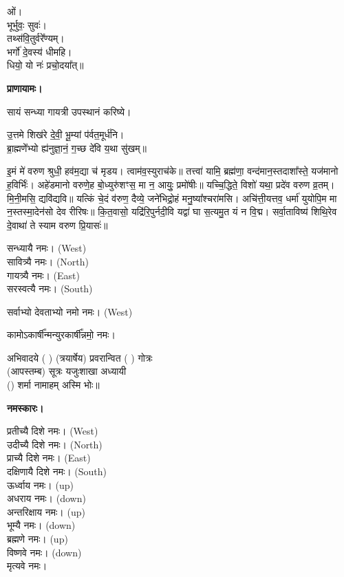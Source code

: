 ओं।\\
भूर्भुवः॒ सुवः॑।\\
तथ्स॑वि॒तुर्वरे᳚ण्यम्।\\
भर्गो॑ दे॒वस्य॑ धीमहि।\\
धियो॒ यो नः॑ प्रचो॒दया᳚त्॥

\textbf{प्राणायामः।}


सायं सन्ध्या गायत्री उपस्थानं करिष्ये।

उ॒त्तमे शिख॑रे दे॒वी॒ भू॒म्यां प॑र्वत॒मूर्ध॑नि।\\
ब्रा॒ह्मणे॑॑भ्यो ह्य॑नुज्ञा॒नं॒ ग॒च्छ दे॑वि य॒था सु॑खम्॥


इ॒मं मे॑ वरुण श्रुधी॒ हव॑म॒द्या च॑ मृडय। त्वाम॑व॒स्युराच॑के॥ तत्त्वा॑ यामि॒ ब्रह्म॑णा॒ वन्द॑मान॒स्तदाशा᳚स्ते॒ यज॑मानो ह॒विर्भिः॑। अहे॑डमानो वरुणे॒ह बो॒ध्युरु॑शꣳस॒ मा न॒ आयुः॒ प्रमो॑षीः॥
यच्चि॒द्धिते॒ विशो॑ यथा॒ प्रदे॑व वरुण व्र॒तम्। मि॒नी॒मसि॒ द्यवि॑द्यवि॥ यत्किं चे॒दं व॑रुण॒ दैव्ये॒ जने॑भिद्रो॒हं मनु॒ष्या᳚श्चरा॑मसि। अचि॑त्ती॒यत्तव॒ धर्मा॑ युयोपि॒म मा न॒स्तस्मा॒देन॑सो देव रीरिषः॥ कि॒त॒वासो॒ यद्रि॑रि॒पुर्नदी॒वि यद्वा॑ घा स॒त्यमु॒त यं न वि॒द्म। सर्वा॒ताविष्य॑ शिथि॒रेव दे॒वाथा॑ ते स्याम वरुण प्रि॒यासः॑॥


सन्ध्यायै नमः।  {\scriptsize (West)}\\
सावित्र्यै नमः। {\scriptsize (North)}\\
गायत्र्यै नमः।  {\scriptsize (East)}\\
सरस्वत्यै नमः।  {\scriptsize (South)}

सर्वाभ्यो देवताभ्यो नमो नमः। {\scriptsize (West)}

कामोऽकार्\mbox{}षी᳚न्मन्युरकार्\mbox{}षी᳚न्नमो॒ नमः।

अभिवादये ( ) (त्रयार्षेय) प्रवरान्वित ( ) गोत्रः\\
(आपस्तम्ब) सूत्रः यजुःशाखा अध्यायी\\
() शर्मा नामाहम् अस्मि भोः॥

\textbf{नमस्कारः।}


प्रतीच्यै दिशे नमः।   {\scriptsize (West)}\\
उदीच्यै दिशे नमः।   {\scriptsize (North)}\\
प्राच्यै दिशे नमः।   {\scriptsize (East)}\\
दक्षिणायै दिशे नमः।  {\scriptsize (South)}\\
ऊर्ध्वाय नमः।   {\scriptsize (up)}\\
अधराय नमः।   {\scriptsize (down)}\\
अन्तरिक्षाय नमः। {\scriptsize (up)}\\
भूम्यै नमः। {\scriptsize (down)}\\
ब्रह्मणे नमः। {\scriptsize (up)}\\
विष्णवे नमः।  {\scriptsize (down)}\\
मृत्यवे नमः।

